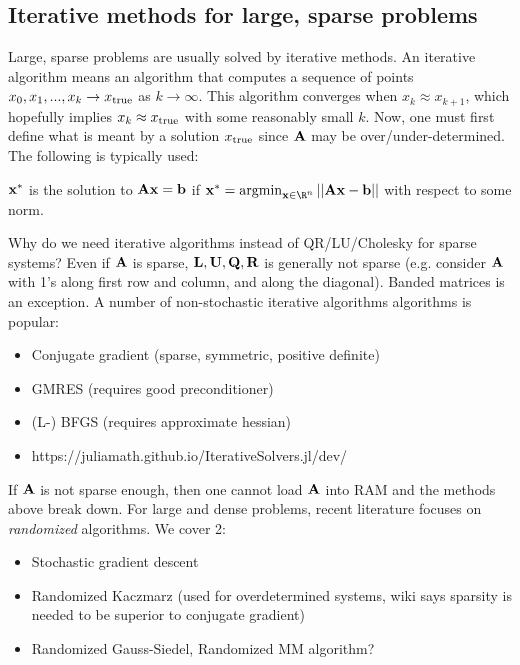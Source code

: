 \documentclass[./some_latex_template.tex]{subfiles}
\begin{document}
\subsection{Iterative methods for large, sparse problems}

Large, sparse problems are usually solved by iterative methods. An iterative algorithm means an algorithm that computes a sequence of points $x_0, x_1, ..., x_k \rightarrow x_{\rm true}$ as $k \rightarrow \infty$. This algorithm converges when $x_k \approx x_{k + 1}$, which hopefully implies $x_{k} \approx x_{\rm true}$ with some reasonably small $k$. Now, one must first define what is meant by a solution $x_{\rm true}$ since $\mathbf{A}$ may be over/under-determined. The following is typically used:

\begin{definitionbox}{}{}
$\mathbf{x}^*$ is the solution to $\mathbf{A} \mathbf{x} = \mathbf{b}$ if $\bx^* = \argmin_{\bx \in \R^n} ||\bA\bx - \bb||$ with respect to some norm.
\end{definitionbox}

\noindent Why do we need iterative algorithms instead of QR/LU/Cholesky for sparse systems? Even if $\mathbf{A}$ is sparse, $\mathbf{L}, \mathbf{U}, \mathbf{Q}, \mathbf{R}$ is generally not sparse (e.g. consider $\mathbf{A}$ with 1's along first row and column, and along the diagonal). Banded matrices is an exception. A number of non-stochastic iterative algorithms algorithms is popular:

\begin{itemize}
	\item Conjugate gradient (sparse, symmetric, positive definite)
	\item GMRES (requires good preconditioner)
	\item (L-) BFGS (requires approximate hessian)
	\item https://juliamath.github.io/IterativeSolvers.jl/dev/
\end{itemize}

\noindent If $\mathbf{A}$ is not sparse enough, then one cannot load $\mathbf{A}$ into RAM and the methods above break down. For large and dense problems, recent literature focuses on \textit{randomized} algorithms. We cover 2:
\begin{itemize}
	\item Stochastic gradient descent
	\item Randomized Kaczmarz (used for overdetermined systems, wiki says sparsity is needed to be superior to conjugate gradient)
	\item Randomized Gauss-Siedel, Randomized MM algorithm? 
\end{itemize}
\end{document}
